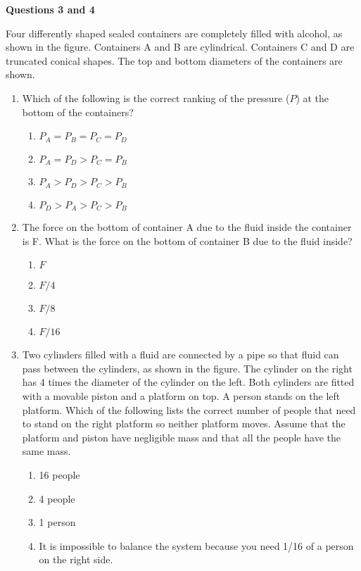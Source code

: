 \documentclass{../../oss-apphys}
\begin{document}
\begin{multicols}{2}
  \textbf{Questions 3 and 4}

  Four differently shaped sealed containers are completely filled with alcohol,
  as shown in the figure. Containers A and B are cylindrical. Containers C and
  D are truncated conical shapes. The top and bottom diameters of the
  containers are shown.
  \begin{enumerate}[leftmargin=18pt,start=3]
    
  \item Which of the following is the correct ranking of the pressure ($P$) at
    the bottom of the containers?
    \begin{enumerate}[noitemsep,topsep=0pt,leftmargin=18pt,label=(\Alph*)]
    \item $P_A = P_B = P_C = P_D$
    \item $P_A = P_D > P_C = P_B$
    \item $P_A > P_D > P_C > P_B$
    \item $P_D > P_A > P_C > P_B$
    \end{enumerate}

  \item The force on the bottom of container A due to the fluid inside the
    container is F. What is the force on the bottom of container B due to
    the fluid inside?
    \begin{enumerate}[noitemsep,topsep=0pt,leftmargin=18pt,label=(\Alph*)]
    \item $F$
    \item $F/4$
    \item $F/8$
    \item $F/16$
    \end{enumerate}

    \columnbreak
    
  \item Two cylinders filled with a fluid are connected by a pipe so that fluid
    can pass between the cylinders, as shown in the figure. The cylinder
    on the right has 4 times the diameter of the cylinder on the left. Both
    cylinders are fitted with a movable piston and a platform on top. A
    person stands on the left platform. Which of the following lists the
    correct number of people that need to stand on the right platform so
    neither platform moves. Assume that the platform and piston have
    negligible mass and that all the people have the same mass.

    \vspace{-.1in}
    \begin{enumerate}[noitemsep,topsep=0pt,leftmargin=18pt,label=(\Alph*)]
    \item \num{16} people
    \item \num{4} people
    \item \num{1} person
    \item It is impossible to balance the system because you need 1/16 of a
      person on the right side.
    \end{enumerate}


\end{enumerate}
\end{multicols}
\end{document}
